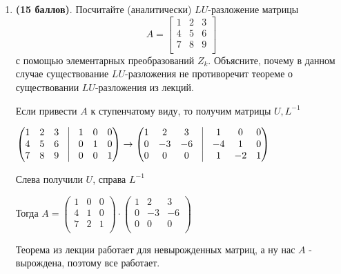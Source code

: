 \documentclass[a4paper, 11pt]{article}
\newcommand{\prob}[1]{\item \textbf{(#1 баллов)}.}
\begin{document}
	
	\begin{enumerate}
		\prob{15} Посчитайте (аналитически) $LU$-разложение матрицы
		\[
		A = 
		\begin{bmatrix}
			1 & 2 & 3 \\
			4 & 5 & 6 \\
			7 & 8 & 9 \\
		\end{bmatrix}
		\]
		с помощью элементарных преобразований $Z_k$.
		Объясните, почему в данном случае существование $LU$-разложения не противоречит теореме о существовании $LU$-разложения из лекций.
		
		Если привести $A$ к ступенчатому виду, то получим матрицы $U, L^{-1}$
		
		$\begin{pmatrix}
			1& 2 & 3 & \vrule & 1 & 0 & 0 \\
			4 & 5 & 6 & \vrule & 0 & 1 & 0 \\
			7 & 8 & 9 & \vrule & 0 & 0 & 1 \\
		\end{pmatrix} \to \begin{pmatrix}
		1 & 2 & 3 & \vrule & 1 & 0 & 0 \\
		0 & -3 & -6 & \vrule & -4 & 1 & 0 \\
		0 & 0 & 0 & \vrule & 1 & -2 & 1 \\
		\end{pmatrix}$
		
		Слева получили $U$, справа $L^{-1}$
		
		Тогда $A = \begin{pmatrix}
			1 & 0 & 0 \\ 
			4 & 1 & 0 \\
			7 & 2 & 1 \\
		\end{pmatrix} \cdot \begin{pmatrix}
		1 & 2 & 3 \\
		0 & -3 & -6 \\
		0 & 0 & 0 \\
		\end{pmatrix}$
		
		Теорема из лекции работает для невырожденных матриц, а ну нас $A$ - вырождена, поэтому все работает.
		

\end{enumerate}
\end{document}
